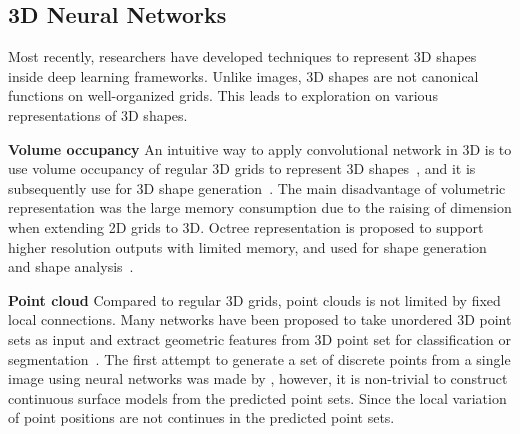 \subsection{3D Neural Networks}
Most recently, researchers have developed techniques to represent 3D shapes inside deep learning frameworks. Unlike images, 3D shapes are not canonical functions on well-organized grids.
This leads to exploration on various representations of 3D shapes.

\noindent\textbf{Volume occupancy} 
An intuitive way to apply convolutional network in 3D is to use volume occupancy of regular 3D grids to represent 3D shapes~\cite{3dshapenet}, and it is subsequently use for 3D shape generation~\cite{3DR2N2,learnobj}.
%
The main disadvantage of volumetric representation was the large memory consumption due to the raising of dimension when extending 2D grids to 3D. 
Octree representation is proposed to support higher resolution outputs with limited memory, and used for shape generation~\cite{octreegen} and shape analysis~\cite{ocnn}.

\noindent\textbf{Point cloud} 
Compared to regular 3D grids, point clouds is not limited by fixed local connections.
Many networks have been proposed to take unordered 3D point sets as input and extract geometric features from 3D point set for classification or segmentation~\cite{pointnet,NIPS2017_7095,pointcnn}.
%
The first attempt to generate a set of discrete points from a single image using neural networks was made by \cite{PSGN}, however, it is non-trivial to construct continuous surface models from the predicted point sets. Since the local variation of point positions are not continues in the predicted point sets.

%

